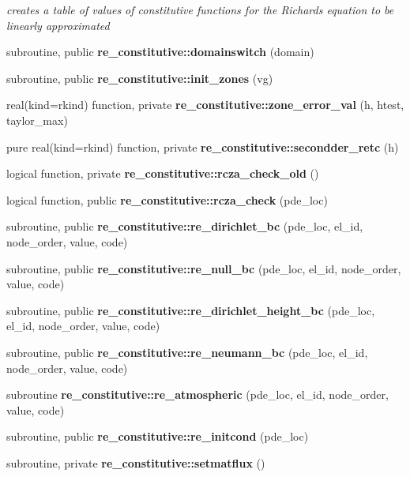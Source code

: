 \begin{DoxyCompactItemize}
\begin{DoxyCompactList}\small\item\em creates a table of values of constitutive functions for the Richards equation to be linearly approximated \end{DoxyCompactList}\item 
subroutine, public {\bf re\+\_\+constitutive\+::domainswitch} (domain)
\item 
subroutine, public {\bf re\+\_\+constitutive\+::init\+\_\+zones} (vg)
\item 
real(kind=rkind) function, private {\bf re\+\_\+constitutive\+::zone\+\_\+error\+\_\+val} (h, htest, taylor\+\_\+max)
\item 
pure real(kind=rkind) function, private {\bf re\+\_\+constitutive\+::secondder\+\_\+retc} (h)
\item 
logical function, private {\bf re\+\_\+constitutive\+::rcza\+\_\+check\+\_\+old} ()
\item 
logical function, public {\bf re\+\_\+constitutive\+::rcza\+\_\+check} (pde\+\_\+loc)
\item 
subroutine, public {\bf re\+\_\+constitutive\+::re\+\_\+dirichlet\+\_\+bc} (pde\+\_\+loc, el\+\_\+id, node\+\_\+order, value, code)
\item 
subroutine, public {\bf re\+\_\+constitutive\+::re\+\_\+null\+\_\+bc} (pde\+\_\+loc, el\+\_\+id, node\+\_\+order, value, code)
\item 
subroutine, public {\bf re\+\_\+constitutive\+::re\+\_\+dirichlet\+\_\+height\+\_\+bc} (pde\+\_\+loc, el\+\_\+id, node\+\_\+order, value, code)
\item 
subroutine, public {\bf re\+\_\+constitutive\+::re\+\_\+neumann\+\_\+bc} (pde\+\_\+loc, el\+\_\+id, node\+\_\+order, value, code)
\item 
subroutine {\bf re\+\_\+constitutive\+::re\+\_\+atmospheric} (pde\+\_\+loc, el\+\_\+id, node\+\_\+order, value, code)
\item 
subroutine, public {\bf re\+\_\+constitutive\+::re\+\_\+initcond} (pde\+\_\+loc)
\item 
subroutine, private {\bf re\+\_\+constitutive\+::setmatflux} ()
\end{DoxyCompactItemize}
